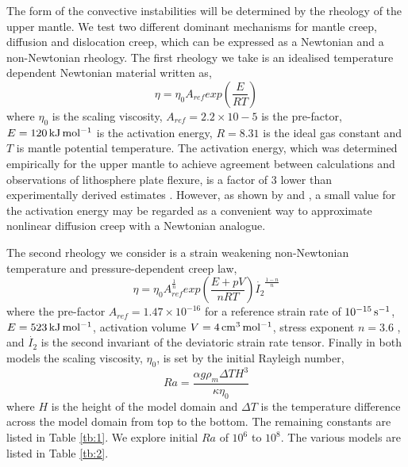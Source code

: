 \documentclass[a4paper,10pt,twocolumn]{paper}
\begin{document}
The form of the convective instabilities will be determined by the rheology of the upper mantle. We test two different dominant mechanisms for mantle creep, diffusion and dislocation creep, which can be expressed as a Newtonian and a non-Newtonian rheology. The first rheology we take is an idealised temperature dependent Newtonian material written as,
\begin{equation}
\eta = \eta_{0}A_{ref}exp\left(\frac{E}{RT}\right)
\end{equation}
where $\eta_{0}$ is the scaling viscosity, $A_{ref} = 2.2\times10-5$ is the pre-factor, $E = 120\rm\,kJ\,mol^{-1}$ is the activation energy, $R=8.31$ is the ideal gas constant and $T$ is mantle potential temperature. The activation energy, which was determined empirically for the upper mantle to achieve agreement between calculations and observations of lithosphere plate flexure, is a factor of 3 lower than experimentally derived estimates \citep{korenaga-jgr-2008,watts-2000}. However, as shown by \cite{christensen-1984} and \cite{jaupart-2011}, a small value for the activation energy may be regarded as a convenient way to approximate nonlinear diffusion creep with a Newtonian analogue.

The second rheology we consider is a strain weakening non-Newtonian temperature and pressure-dependent creep law,
\begin{equation}
\eta = \eta_{0}A_{ref}^{\frac{1}{n}}exp\left(\frac{E+pV}{nRT}\right) \dot{I_{2}}^{\frac{1-n}{n}}
\end{equation}
where the pre-factor $A_{ref} = 1.47\times10^{-16}$ for a reference strain rate of $10^{-15}\rm\,s^{-1}$, $E = 523\rm\,kJ\,mol^{-1}$, activation volume $V = 4\rm\,cm^{3}\,mol^{-1}$, stress exponent $n=3.6$ \citep{korenaga-jgr-2008}, and $\dot{I_{2}}$ is the second invariant of the deviatoric strain rate tensor. Finally in both models the scaling viscosity, $\eta_{0}$, is set by the initial Rayleigh number,
\begin{equation}
Ra = \frac{\alpha g\rho_{m}\Delta TH^{3}}{\kappa \eta_{0}}
\end{equation}
where $H$ is the height of the model domain and $\Delta T$ is the temperature difference across the model domain from top to the bottom. The remaining constants are listed in Table \ref{tb:1}. We explore initial $Ra$ of $10^6$ to $10^8$. The various models are listed in Table \ref{tb:2}.
\end{document}
